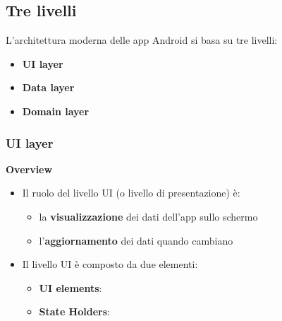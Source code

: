 \subsection{Tre livelli}
\par L'architettura moderna delle app Android si basa su tre livelli:
\begin{itemize}
    \item \textbf{UI layer}
    \item \textbf{Data layer}
    \item \textbf{Domain layer}
\end{itemize}

\subsubsection{UI layer}
\par \textbf{Overview}
\begin{itemize}
    \item Il ruolo del livello UI (o livello di presentazione) è:
    \begin{itemize}
        \item la \textbf{visualizzazione} dei dati dell'app sullo schermo
        \item l'\textbf{aggiornamento} dei dati quando cambiano
    \end{itemize}
    \item Il livello UI è composto da due elementi:
    \begin{itemize}
        \item \textbf{UI elements}:
        \item \textbf{State Holders}:
    \end{itemize}
\end{itemize}

